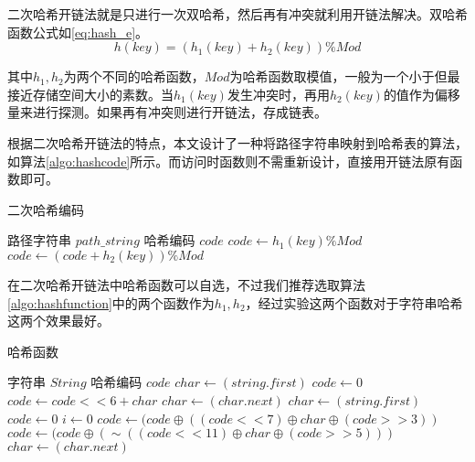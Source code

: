 \documentclass{XDBAthesis}
\numberwithin{algorithm}{chapter}
\begin{document}
二次哈希开链法就是只进行一次双哈希，然后再有冲突就利用开链法解决。双哈希函数公式如\ref{eq:hash_e}。
\begin{equation}
    h(key)=(h_1 (key)+ h_2 (key))\%Mod
    \label{eq:hash_e}
\end{equation}

其中$h_1 ,h_2 $为两个不同的哈希函数，$Mod$为哈希函数取模值，一般为一个小于但最接近存储空间大小的素数。当$h_1 (key)$发生冲突时，再用$h_2 (key)$的值作为偏移量来进行探测。如果再有冲突则进行开链法，存成链表。

根据二次哈希开链法的特点，本文设计了一种将路径字符串映射到哈希表的算法，如算法\ref{algo:hashcode}所示。而访问时函数则不需重新设计，直接用开链法原有函数即可。

\begin{algorithm}
\caption{二次哈希编码}
\label{algo:hashcode}
\begin{algorithmic}[1]
    \Require 路径字符串 $path\_string$
    \Ensure 哈希编码 $code$
        \State $code \gets h_1 (key)\%Mod$
            \State $code \gets (code+h_2 (key))\%Mod$
        \EndIf
        \State {}
    \EndFunction     
\end{algorithmic}
\end{algorithm}

在二次哈希开链法中哈希函数可以自选，不过我们推荐选取算法\ref{algo:hashfunction}中的两个函数作为$h_1 ,h_2 $，经过实验这两个函数对于字符串哈希这两个效果最好。

\begin{algorithm}
\caption{哈希函数}
\label{algo:hashfunction}
\begin{algorithmic}[1]
    \Require 字符串 $String$
    \Ensure 哈希编码 $code$
        \State $char \gets (string.first)$
        \State $code \gets 0$
            \State $code \gets code<<6+char$
            \State $char \gets (char.next)$
        \EndWhile
        \State {}
    \EndFunction
        \State $char \gets (string.first)$
        \State $code \gets 0$
        \State $i \gets 0 $
                \State $code \gets (code\oplus ((code<<7)\oplus char\oplus (code>>3))$
            \Else
                \State $code \gets (code\oplus (\sim ((code<<11)\oplus char\oplus (code>>5)))  $
            \EndIf
            \State $char \gets (char.next)$
        \EndWhile
        \State {}
    \EndFunction          
\end{algorithmic}
\end{algorithm}
\end{document}
